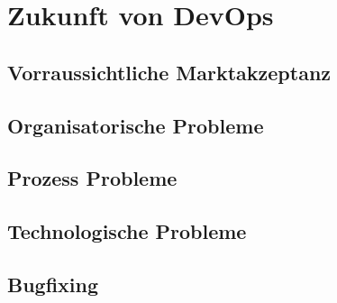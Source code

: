 \chapter{Zukunft von DevOps}

\section{Vorraussichtliche Marktakzeptanz}

\section{Organisatorische Probleme}

\section{Prozess Probleme}

\section{Technologische Probleme}

\section{Bugfixing}